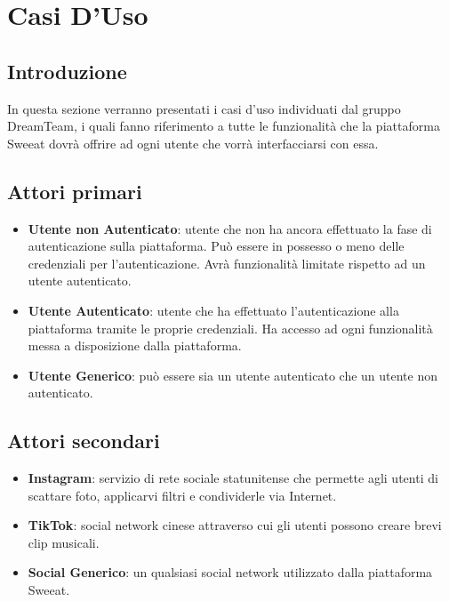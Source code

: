 \section{Casi D'Uso}
\subsection{Introduzione}
In questa sezione verranno presentati i casi d’uso individuati dal gruppo DreamTeam, i quali fanno riferimento a tutte le funzionalità che la piattaforma Sweeat dovrà offrire ad ogni utente che vorrà interfacciarsi con essa.
\subsection{Attori primari}
\begin{itemize}
    \item \textbf{Utente non Autenticato}: utente che non ha ancora effettuato la fase di autenticazione sulla piattaforma. Può essere in possesso o meno delle credenziali per l’autenticazione. Avrà funzionalità limitate rispetto ad un utente autenticato.
    \item \textbf{Utente Autenticato}: utente che ha effettuato l’autenticazione alla piattaforma tramite le proprie credenziali. Ha accesso ad ogni funzionalità messa a disposizione dalla piattaforma.
    \item \textbf{Utente Generico}: può essere sia un utente autenticato che un utente non autenticato.
\end{itemize}
\subsection{Attori secondari}
\begin{itemize}
    \item \textbf{Instagram}: servizio di rete sociale statunitense che permette agli utenti di scattare foto, applicarvi filtri e condividerle via Internet.
    \item \textbf{TikTok}: social network cinese attraverso cui gli utenti possono creare brevi clip musicali.
    \item \textbf{Social Generico}: un qualsiasi social network utilizzato dalla piattaforma Sweeat.
\end{itemize}
\clearpage 